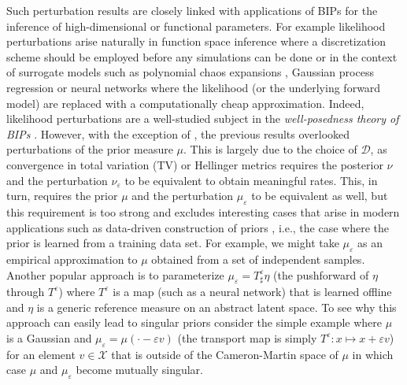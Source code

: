 \documentclass[final]{siamart171218}
\newcommand{\mcl}{\mathcal}
\newcommand{\veps}{\varepsilon}
\newcommand{\mX}{\mcl{X}}
\newcommand{\D}{\mathcal{D}}
\begin{document}
Such perturbation results 
are closely linked with applications of BIPs for the inference of high-dimensional 
or functional parameters. For example likelihood perturbations arise naturally in 
function space inference where a discretization scheme should be employed before 
any simulations can be done or in the context of surrogate models 
such as polynomial chaos expansions \cite{marzouk2007stochastic, schwab-sparse, marzouk2009dimensionality, ma2009efficient}, Gaussian process regression \cite{stuart2018posterior, teckentrup2020convergence} or neural networks \cite{herrmann2020deep, li2020fourier} where the likelihood (or the underlying forward model) 
are replaced  with a computationally cheap approximation.
Indeed, likelihood perturbations 
 are a well-studied subject in the {\it well-posedness theory of  BIPs}
\cite{stuart-bayesian-lecture-notes, stuart-acta-numerica, hosseini-convex,
  hosseini-sparse, latz, sullivan, owhadi2015brittleness, sprungk}.
  However,
with the exception of \cite{sprungk}, the previous results overlooked
perturbations of the prior measure $\mu$. This is largely due to the
choice of $\D$, as convergence in total variation (TV) or
Hellinger metrics requires the posterior $\nu$ and the perturbation $\nu_\veps$
to be equivalent to obtain meaningful rates. This, in turn, requires the prior $\mu$ and the perturbation
$\mu_\veps$ to be equivalent as well, but this requirement
is too strong and excludes interesting cases that arise in 
modern applications such as data-driven construction of priors 
\cite{arridge2019solving, laumont2022bayesian, patel2022solution}, i.e., the 
case where the prior is learned from a training data set. For example, we might take $\mu_\veps$
as an empirical approximation to $\mu$ obtained from a set of independent samples. 
Another popular approach is to parameterize 
$\mu_\veps = T^\veps_\sharp \eta$
(the pushforward of $\eta$ through $T^\veps$)
where $T^\veps$ is a map (such as a neural network)  that is learned offline
 and $\eta$ is a generic reference measure on an abstract latent space. 
 To see why this approach can easily lead to singular priors consider 
the simple example where $\mu$ is a Gaussian  and $\mu_\veps = \mu( \cdot - \veps v)$ (the transport
map is simply $T^\veps: x \mapsto x + \veps v $)
for an element $v \in \mX$ that is  outside of the Cameron-Martin space of $\mu$ \cite[Sec.~2.4]{bogachev-gaussian} in which case $\mu$ and $\mu_\veps$ become mutually singular.
\end{document}
